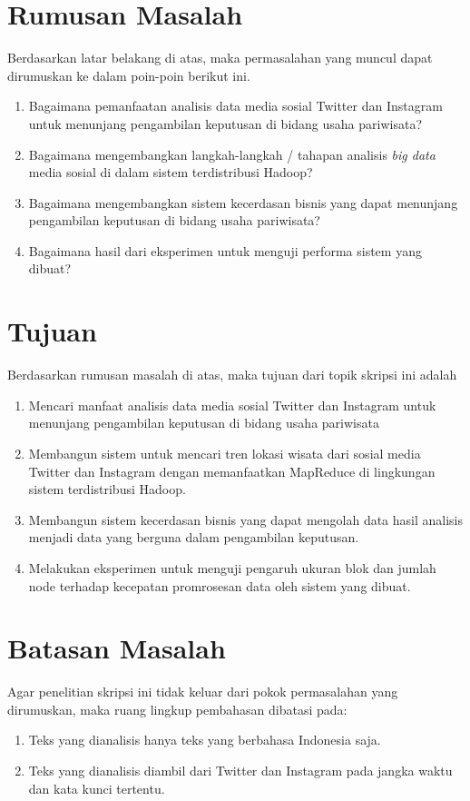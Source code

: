\section{Rumusan Masalah}
\label{sec:rumusan_masalah}
Berdasarkan latar belakang di atas, maka permasalahan yang muncul dapat dirumuskan ke dalam poin-poin berikut ini.
\begin{enumerate}
	\item Bagaimana pemanfaatan analisis data media sosial Twitter dan Instagram untuk menunjang pengambilan keputusan di bidang usaha pariwisata?
	\item Bagaimana mengembangkan langkah-langkah / tahapan analisis \textit{big data} media sosial di dalam sistem terdistribusi Hadoop?
	\item Bagaimana mengembangkan sistem kecerdasan bisnis yang dapat menunjang pengambilan keputusan di bidang usaha pariwisata?
	\item Bagaimana hasil dari eksperimen untuk menguji performa sistem yang dibuat?
\end{enumerate}

\section{Tujuan}
\label{sec:tujuan}
Berdasarkan rumusan masalah di atas, maka tujuan dari topik skripsi ini adalah 
\begin{enumerate}
	\item Mencari manfaat analisis data media sosial Twitter dan Instagram untuk menunjang pengambilan keputusan di bidang usaha pariwisata
	\item Membangun sistem untuk mencari tren lokasi wisata dari sosial media Twitter dan Instagram dengan memanfaatkan MapReduce di lingkungan sistem terdistribusi Hadoop.
	\item Membangun sistem kecerdasan bisnis yang dapat mengolah data hasil analisis menjadi data yang berguna dalam pengambilan keputusan.
	\item Melakukan eksperimen untuk menguji pengaruh ukuran blok dan jumlah node terhadap kecepatan promrosesan data oleh sistem yang dibuat.
\end{enumerate}

\section{Batasan Masalah}
\label{sec:batasan_masalah}
Agar penelitian skripsi ini tidak keluar dari pokok permasalahan yang dirumuskan, maka ruang lingkup pembahasan dibatasi pada:
\begin{enumerate}
	\item Teks yang dianalisis hanya teks yang berbahasa Indonesia saja. 
	\item Teks yang dianalisis diambil dari Twitter dan Instagram pada jangka waktu dan kata kunci tertentu.
\end{enumerate}

